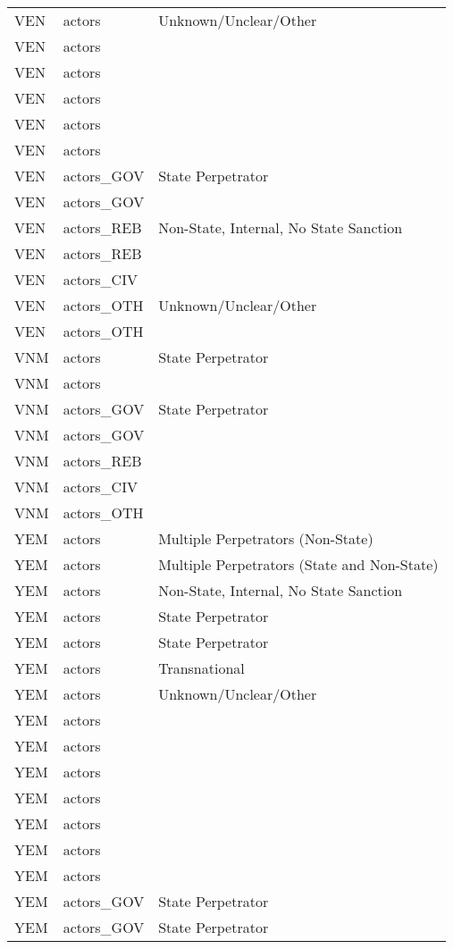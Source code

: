 \begin{table}[ht]
\begin{tabular}{lll}
  VEN & actors & Unknown/Unclear/Other \\ 
  VEN & actors &  \\ 
  VEN & actors &  \\ 
  VEN & actors &  \\ 
  VEN & actors &  \\ 
  VEN & actors &  \\ 
  VEN & actors\_GOV & State Perpetrator \\ 
  VEN & actors\_GOV &  \\ 
  VEN & actors\_REB & Non-State, Internal, No State Sanction \\ 
  VEN & actors\_REB &  \\ 
  VEN & actors\_CIV &  \\ 
  VEN & actors\_OTH & Unknown/Unclear/Other \\ 
  VEN & actors\_OTH &  \\ 
  VNM & actors & State Perpetrator \\ 
  VNM & actors &  \\ 
  VNM & actors\_GOV & State Perpetrator \\ 
  VNM & actors\_GOV &  \\ 
  VNM & actors\_REB &  \\ 
  VNM & actors\_CIV &  \\ 
  VNM & actors\_OTH &  \\ 
  YEM & actors & Multiple Perpetrators (Non-State) \\ 
  YEM & actors & Multiple Perpetrators (State and Non-State) \\ 
  YEM & actors & Non-State, Internal, No State Sanction \\ 
  YEM & actors & State Perpetrator \\ 
  YEM & actors & State Perpetrator \\ 
  YEM & actors & Transnational \\ 
  YEM & actors & Unknown/Unclear/Other \\ 
  YEM & actors &  \\ 
  YEM & actors &  \\ 
  YEM & actors &  \\ 
  YEM & actors &  \\ 
  YEM & actors &  \\ 
  YEM & actors &  \\ 
  YEM & actors &  \\ 
  YEM & actors\_GOV & State Perpetrator \\ 
  YEM & actors\_GOV & State Perpetrator \\ 

\end{tabular}
\end{table}
